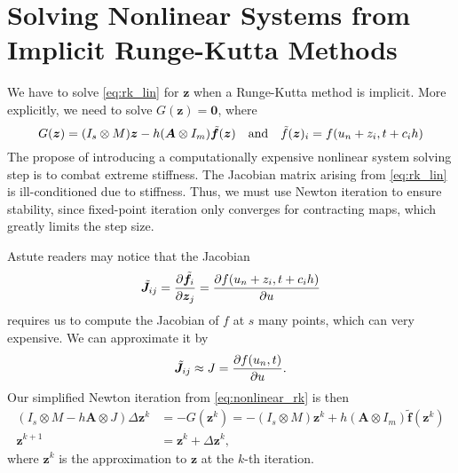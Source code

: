 \documentclass[a4paper,9pt]{article}
\theoremstyle{definition}
\theoremstyle{remark}
\begin{document}
\section{Solving Nonlinear Systems from Implicit Runge-Kutta Methods}
We have to solve \cref{eq:rk_lin} for $\bm{z}$ when a Runge-Kutta method is
implicit. More explicitly, we need to solve $G(\bm{z}) = \bm{0}$, where
\begin{equation} \label{eq:nonlinear_rk}
  G(\bm{z}) = (I_s \otimes M) \bm{z} - h(\bm{A}\otimes I_m) \tilde{\bm{f}}(\bm{z}) \qq{and}
  \tilde{f}(\bm{z})_i = f(u_n+z_i, t+c_i h)
\end{equation}
The propose of introducing a computationally expensive nonlinear system solving
step is to combat extreme stiffness. The Jacobian matrix arising from
\cref{eq:rk_lin} is ill-conditioned due to stiffness. Thus, we must use Newton
iteration to ensure stability, since fixed-point iteration only converges for
contracting maps, which greatly limits the step size.

Astute readers may notice that the Jacobian
\begin{equation}
  \tilde{\bm{J}}_{ij} = \pdv{\tilde{\bm{f}}_i}{\bm{z}_j} = \pdv{f(u_n + z_i, t+c_ih)}{u}
\end{equation}
requires us to compute the Jacobian of $f$ at $s$ many points, which can very
expensive. We can approximate it by
\begin{equation}
  \tilde{\bm{J}}_{ij} \approx J = \pdv{f(u_n, t)}{u}.
\end{equation}
Our simplified Newton iteration from \cref{eq:nonlinear_rk} is then
\begin{align} \label{eq:newton_1}
  (I_s \otimes M - h\bm{A}\otimes J) \Delta \bm{z}^k &= -G(\bm{z}^k) = -(I_s
  \otimes M) \bm{z}^k + h(\bm{A}\otimes I_m) \tilde{\bm{f}}(\bm{z}^k) \\
  \bm{z}^{k+1} &= \bm{z}^{k} + \Delta \bm{z}^k \label{eq:newton_2},
\end{align}
where $\bm{z}^k$ is the approximation to $\bm{z}$ at the $k$-th iteration.
\end{document}
